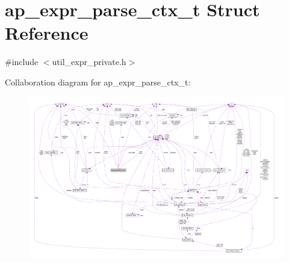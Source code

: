 \hypertarget{structap__expr__parse__ctx__t}{}\section{ap\+\_\+expr\+\_\+parse\+\_\+ctx\+\_\+t Struct Reference}
\label{structap__expr__parse__ctx__t}


{\ttfamily \#include $<$util\+\_\+expr\+\_\+private.\+h$>$}



Collaboration diagram for ap\+\_\+expr\+\_\+parse\+\_\+ctx\+\_\+t\+:
\nopagebreak
\begin{figure}[H]
\begin{center}
\leavevmode
\includegraphics[width=350pt]{structap__expr__parse__ctx__t__coll__graph}
\end{center}
\end{figure}

